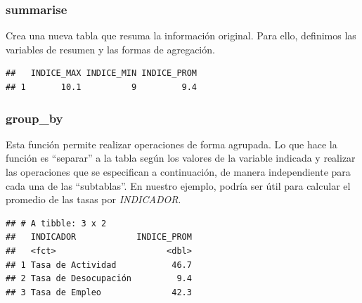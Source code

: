 \documentclass[]{book}
\newenvironment{Shaded}{\begin{snugshade}}{\end{snugshade}}
\newcommand{\DataTypeTok}[1]{\textcolor[rgb]{0.13,0.29,0.53}{#1}}
\newcommand{\KeywordTok}[1]{\textcolor[rgb]{0.13,0.29,0.53}{\textbf{#1}}}
\newcommand{\NormalTok}[1]{#1}
\newcommand{\OperatorTok}[1]{\textcolor[rgb]{0.81,0.36,0.00}{\textbf{#1}}}
\newcommand{\StringTok}[1]{\textcolor[rgb]{0.31,0.60,0.02}{#1}}
\begin{document}
\hypertarget{summarise}{%
\subsubsection{summarise}\label{summarise}}

Crea una nueva tabla que resuma la información original. Para ello, definimos las variables de resumen y las formas de agregación.

\begin{Shaded}
\end{Shaded}

\begin{verbatim}
##   INDICE_MAX INDICE_MIN INDICE_PROM
## 1       10.1          9         9.4
\end{verbatim}

\hypertarget{group_by}{%
\subsubsection{group\_by}\label{group_by}}

Esta función permite realizar operaciones de forma agrupada. Lo que hace la función es ``separar'' a la tabla según los valores de la variable indicada y realizar las operaciones que se especifican a continuación, de manera independiente para cada una de las ``subtablas''. En nuestro ejemplo, podría ser útil para calcular el promedio de las tasas por \emph{INDICADOR}.

\begin{Shaded}
\end{Shaded}

\begin{verbatim}
## # A tibble: 3 x 2
##   INDICADOR            INDICE_PROM
##   <fct>                      <dbl>
## 1 Tasa de Actividad           46.7
## 2 Tasa de Desocupación         9.4
## 3 Tasa de Empleo              42.3
\end{verbatim}
\end{document}
